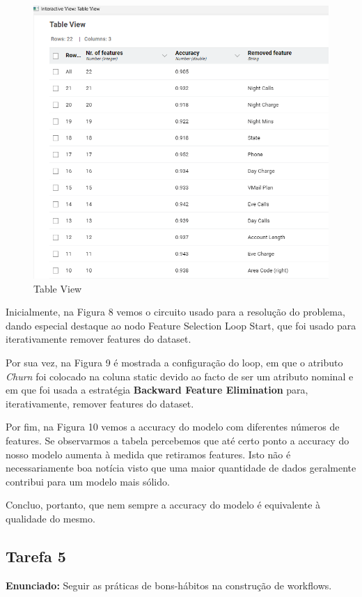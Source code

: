 \documentclass[a4paper, 12pt]{article}
\begin{document}
\begin{figure}
    \centering
    \includegraphics{T4/Stats.png}
    \caption{Table View}
    \label{fig:enter-label}
\end{figure}

\newpage

Inicialmente, na Figura 8 vemos o circuito usado para a resolução do problema, dando especial destaque ao nodo Feature Selection Loop Start, que foi usado para iterativamente remover features do dataset.  

Por sua vez, na Figura 9 é mostrada a configuração do loop, em que o atributo \textit{Churn} foi colocado na coluna static devido ao facto de ser um atributo nominal e em que foi usada a estratégia \textbf{Backward Feature Elimination} para, iterativamente, remover features do dataset.  

Por fim, na Figura 10 vemos a accuracy do modelo com diferentes números de features. Se observarmos a tabela percebemos que até certo ponto a accuracy do nosso modelo aumenta à medida que retiramos features. Isto não é necessariamente boa notícia visto que uma maior quantidade de dados geralmente contribui para um modelo mais sólido. 

Concluo, portanto, que nem sempre a accuracy do modelo é equivalente à qualidade do mesmo.

\newpage

\subsection{Tarefa 5}
\textbf{Enunciado:} Seguir as práticas de bons-hábitos na construção de workflows.
\end{document}
